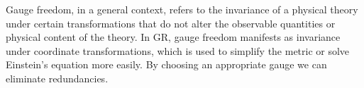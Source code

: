 



\newcommand{\pert}{\ALIASpert}           %
\newcommand*{\ah}{\ALIASah}                     %
\newcommand{\Ft}{\ALIASFt}
\newcommand{\dummy}{\ALIASdummy}
%
\newcommand*\mhat{\hat{\vec{m}}}
\newcommand*\nhat{\hat{\vec{n}}}
\newcommand*\Ohat{\hat{\vec{\varOmega}}}
%
\newcommand*{\polplus}{\ALIASpolplus}
\newcommand*{\polcross}{\ALIASpolcross}



Gauge freedom, in a general context, refers to the invariance of a physical theory under certain transformations that do not alter the observable quantities or physical content of the theory. In GR, gauge freedom manifests as invariance under coordinate transformations, which is used to simplify the metric or solve Einstein's equation more easily. By choosing an appropriate gauge we can eliminate redundancies. 

